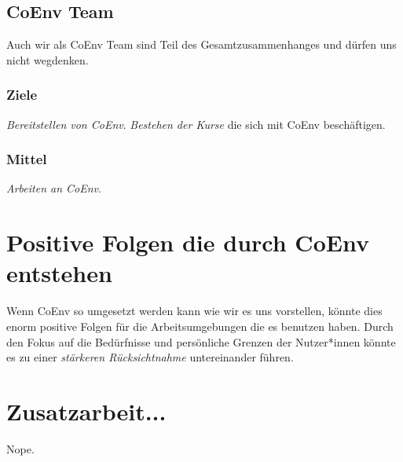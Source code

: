 \documentclass{article}
\begin{document}
\subsection{CoEnv Team}
Auch wir als CoEnv Team sind Teil des Gesamtzusammenhanges und dürfen uns nicht wegdenken.

\subsubsection*{Ziele}
\emph{Bereitstellen von CoEnv}. \emph{Bestehen der Kurse} die sich mit CoEnv beschäftigen.

\subsubsection*{Mittel}
\emph{Arbeiten an CoEnv}.



\section{Positive Folgen die durch CoEnv entstehen}
Wenn CoEnv so umgesetzt werden kann wie wir es uns vorstellen, könnte dies enorm positive Folgen für die Arbeitsumgebungen die es benutzen haben. Durch den Fokus auf die Bedürfnisse und persönliche Grenzen der Nutzer*innen könnte es zu einer \emph{stärkeren Rücksichtnahme} untereinander führen.

\section{Zusatzarbeit...}

Nope.

\newpage



\end{document}

